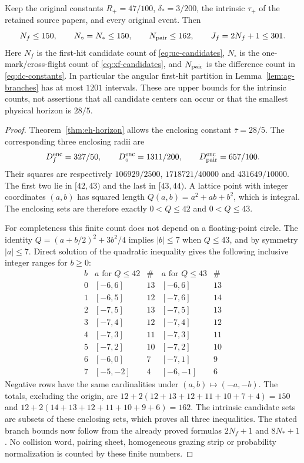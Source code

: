 \begin{corollary}
\label{cor:eh-counts}
Keep the original constants $R_+=47/100$, $\delta_*=3/200$, the intrinsic
$\tau_+$ of the retained source papers, and every original event. Then
\[
 N_f\le150,\qquad N_\circ=N_*\le150,\qquad N_{\rm pair}\le162,
 \qquad J_f=2N_f+1\le301.
\]
Here $N_f$ is the first-hit candidate count of
\eqref{eq:uc-candidates}, $N_\circ$ is the one-mark/cross-flight count
of \eqref{eq:xf-candidates}, and $N_{\rm pair}$ is the difference count
in \eqref{eq:dc-constants}. In particular the angular first-hit partition
in Lemma~\ref{lem:ag-branches} has at most $1201$ intervals.
These are upper bounds for the intrinsic counts, not assertions that
all candidate centers can occur or that the smallest physical horizon
is $28/5$.
\end{corollary}
\begin{proof}
Theorem~\ref{thm:eh-horizon} allows the enclosing constant
$\overline\tau=28/5$. The corresponding three enclosing radii are
\[
 D_f^{\rm enc}=327/50,\qquad
 D_\circ^{\rm enc}=1311/200,\qquad
 D_{\rm pair}^{\rm enc}=657/100.
\]
Their squares are respectively $106929/2500$, $1718721/40000$ and
$431649/10000$. The first two lie in $[42,43)$ and the last in
$[43,44)$. A lattice point with integer coordinates $(a,b)$ has
squared length $Q(a,b)=a^2+ab+b^2$, which is integral. The enclosing
sets are therefore exactly $0<Q\le42$ and $0<Q\le43$.

For completeness this finite count does not depend on a floating-point
circle. The identity $Q=(a+b/2)^2+3b^2/4$ implies $|b|\le7$ when
$Q\le43$, and by symmetry $|a|\le7$. Direct solution of the quadratic
inequality gives the following inclusive integer ranges for $b\ge0$:
\[
\begin{array}{c|c|c|c|c}
 b& a\text{ for }Q\le42&\#&a\text{ for }Q\le43&\#\\ \hline
0&[-6,6]&13&[-6,6]&13\\
1&[-6,5]&12&[-7,6]&14\\
2&[-7,5]&13&[-7,5]&13\\
3&[-7,4]&12&[-7,4]&12\\
4&[-7,3]&11&[-7,3]&11\\
5&[-7,2]&10&[-7,2]&10\\
6&[-6,0]&7&[-7,1]&9\\
7&[-5,-2]&4&[-6,-1]&6
\end{array}
\]
Negative rows have the same cardinalities under $(a,b)\mapsto(-a,-b)$.
The totals, excluding the origin, are
$12+2(12+13+12+11+10+7+4)=150$ and
$12+2(14+13+12+11+10+9+6)=162$.
The intrinsic candidate sets are subsets of these enclosing sets,
which proves all three inequalities. The stated branch bounds now
follow from the already proved formulas $2N_f+1$ and $8N_*+1$.
No collision word, pairing sheet, homogeneous grazing strip or
probability normalization is counted by these finite numbers.
\end{proof}

